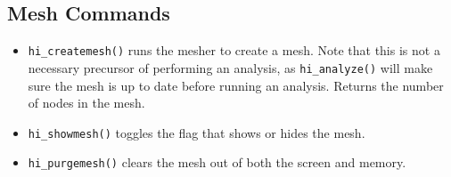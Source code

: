 \subsection{Mesh Commands}

\begin{itemize}
\item \texttt{hi\_createmesh()} runs the mesher to create a mesh. Note that this is not
a necessary precursor of performing an analysis, as
\texttt{hi\_analyze()} will make sure the mesh is up to date before
running an analysis. Returns the number of nodes in the mesh.

\item \texttt{hi\_showmesh()} toggles the flag that shows or hides the mesh.

\item \texttt{hi\_purgemesh()} clears the mesh out of both the screen and memory.
\end{itemize}

